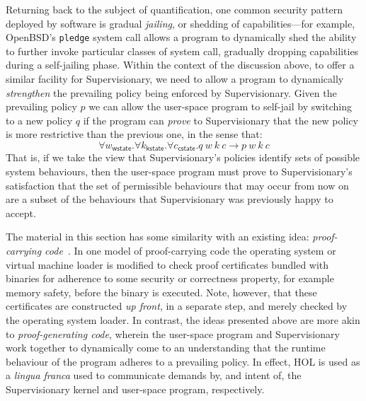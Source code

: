 \documentclass[a4paper, UKenglish, cleveref, autoref, thm-restate, colorlinks]{lipics-v2021}
\newcommand{\fall}[1]{\forall{#1}.}
\begin{document}
Returning back to the subject of quantification, one common security pattern deployed by software is gradual \emph{jailing}, or shedding of capabilities---for example, OpenBSD's \texttt{pledge} system call allows a program to dynamically shed the ability to further invoke particular classes of system call, gradually dropping capabilities during a self-jailing phase.
Within the context of the discussion above, to offer a similar facility for Supervisionary, we need to allow a program to dynamically \emph{strengthen} the prevailing policy being enforced by Supervisionary.
Given the prevailing policy $p$ we can allow the user-space program to self-jail by switching to a new policy $q$ if the program can \emph{prove} to Supervisionary that the new policy is more restrictive than the previous one, in the sense that:
\begin{displaymath}
\fall{w_{\mathsf{wstate}}}\fall{k_{\mathsf{kstate}}}\fall{c_{\mathsf{cstate}}}q\ w\ k\ c \longrightarrow p\ w\ k\ c
\end{displaymath}
That is, if we take the view that Supervisionary's policies identify sets of possible system behaviours, then the user-space program must prove to Supervisionary's satisfaction that the set of permissible behaviours that may occur from now on are a subset of the behaviours that Supervisionary was previously happy to accept.

The material in this section has some similarity with an existing idea: \emph{proof-carrying code}~\cite{DBLP:reference/crypt/Necula11}.
In one model of proof-carrying code the operating system or virtual machine loader is modified to check proof certificates bundled with binaries for adherence to some security or correctness property, for example memory safety, before the binary is executed.
Note, however, that these certificates are constructed \emph{up front}, in a separate step, and merely checked by the operating system loader.
In contrast, the ideas presented above are more akin to \emph{proof-generating code}, wherein the user-space program and Supervisionary work together to dynamically come to an understanding that the runtime behaviour of the program adheres to a prevailing policy.
In effect, HOL is used as a \emph{lingua franca} used to communicate demands by, and intent of, the Supervisionary kernel and user-space program, respectively.
\end{document}
